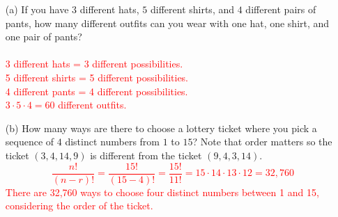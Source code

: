 \documentclass[12pt]{article}
\begin{document}
\begin{enumerate}
\item[(a)] If you have $3$ different hats, $5$ different shirts, and $4$ different pairs of pants, how many different outfits can you wear with one hat, one shirt, and one pair of pants? \\
\\ \textcolor{red}{3 different hats = 3 different possibilities.}\\
\textcolor{red}{5 different shirts = 5 different possibilities.}\\
\textcolor{red}{4 different pants = 4 different possibilities.}\\
\textcolor{red}{$3 \cdot 5 \cdot 4 = 60$ different outfits.}

\item[(b)] How many ways are there to choose a lottery ticket where you pick a sequence of $4$ distinct numbers from $1$ to $15$? Note that order matters so the ticket $(3,4,14,9)$ is different from the ticket $(9,4,3,14)$.
\\ \textcolor{red}{$$\frac{n!}{(n-r)!} = \frac{15!}{(15-4)!} = \frac{15!}{11!} = 15 \cdot 14 \cdot 13 \cdot 12 = 32,760$$ There are 32,760 ways to choose four distinct numbers between 1 and 15, considering the order of the ticket.}


\end{enumerate}
\end{document}
